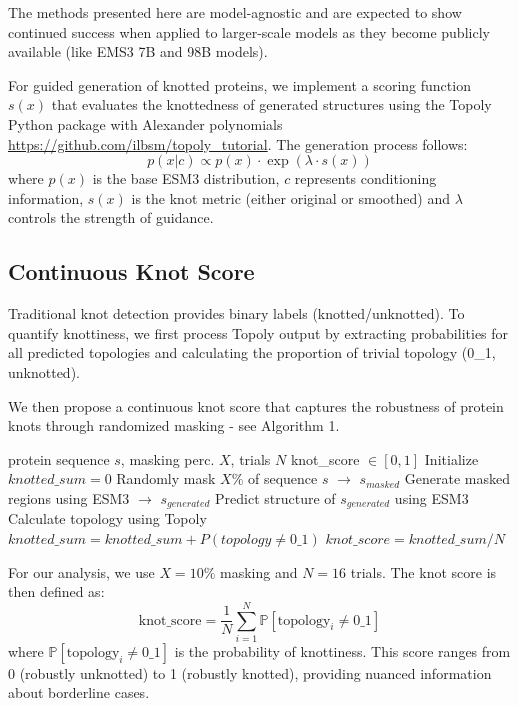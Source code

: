 \documentclass{article}
\theoremstyle{plain}
\theoremstyle{definition}
\theoremstyle{remark}
\begin{document}
The methods presented here are model-agnostic and are expected to show continued success when applied to larger-scale models as they become publicly available (like EMS3 7B and 98B models).

For guided generation of knotted proteins, we implement a scoring function $s(x)$ that evaluates the knottedness of generated structures using the Topoly Python package with Alexander polynomials \url{https://github.com/ilbsm/topoly_tutorial}. The generation process follows:
\begin{equation}
p(x|c) \propto p(x) \cdot \exp(\lambda \cdot s(x))
\end{equation}
where $p(x)$ is the base ESM3 distribution, $c$ represents conditioning information, $s(x)$ is the knot metric (either original or smoothed) and $\lambda$ controls the strength of guidance. 

\subsection{Continuous Knot Score}

Traditional knot detection provides binary labels (knotted/unknotted). To quantify knottiness, we first process Topoly output by extracting probabilities for all predicted topologies and calculating the proportion of trivial topology (0\_1, unknotted).

We then propose a continuous knot score that captures the robustness of protein knots through randomized masking - see Algorithm 1.

\begin{algorithm}[tb]
   \caption{Randomized Knot Score Calculation}
   \label{alg:knot_score}
\begin{algorithmic}
    protein sequence $s$, masking perc. $X$, trials $N$
    knot\_score $\in [0, 1]$
   \STATE Initialize $knotted\_sum = 0$
   \STATE Randomly mask $X\%$ of sequence $s$ $\rightarrow$ $s_{masked}$
   \STATE Generate masked regions using ESM3 $\rightarrow$ $s_{generated}$
   \STATE Predict structure of $s_{generated}$ using ESM3
   \STATE Calculate topology using Topoly
   \STATE $knotted\_sum = knotted\_sum + P(topology \neq 0\_1)$
   \ENDFOR
    $knot\_score = knotted\_sum / N$
\end{algorithmic}
\end{algorithm}

For our analysis, we use $X=10\%$ masking and $N=16$ trials. The knot score is then defined as:
\begin{equation}
\text{knot\_score} = \frac{1}{N} \sum_{i=1}^{N} \mathbb{P}[\text{topology}_i \neq 0\_1]
\end{equation}
where $\mathbb{P}[\text{topology}_i \neq 0\_1]$ is the probability of knottiness. This score ranges from 0 (robustly unknotted) to 1 (robustly knotted), providing nuanced information about borderline cases.
\end{document}
